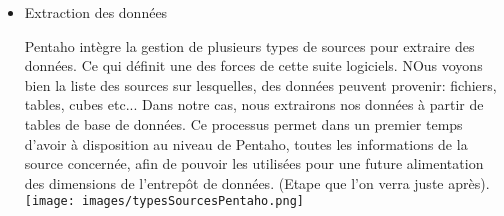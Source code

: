 \documentclass[12pt,a4wide,twoside]{report}
\begin{document}
\begin{itemize}
	\item Extraction des données \newline
	\begin{multicols}{2}
Pentaho intègre la gestion de plusieurs types de sources pour extraire des données. Ce qui définit une des forces de cette suite logiciels. NOus voyons bien la liste des sources sur lesquelles, des données peuvent provenir: fichiers, tables, cubes etc...\newline
Dans notre cas, nous extrairons nos données à partir de tables de base de données. Ce processus permet dans un premier temps d'avoir à disposition au niveau de Pentaho, toutes les informations de la source concernée, afin de pouvoir les utilisées pour une future alimentation des dimensions de l'entrepôt de données. (Etape que l'on verra juste après). 
\texttt{[image: images/typesSourcesPentaho.png]}
\end{multicols}


\end{itemize}
\end{document}
